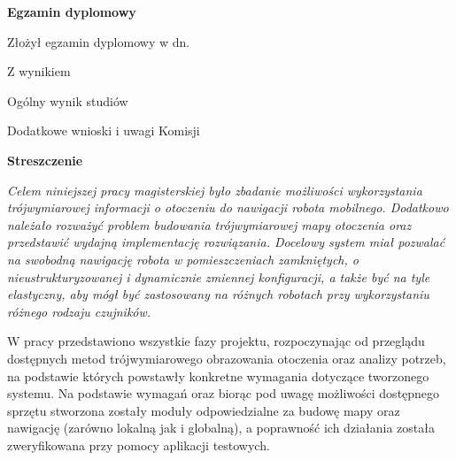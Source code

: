 \begin{titlepage}
    \begin{center}
 	{\large\bfseries Egzamin dyplomowy} \par\bigskip\bigskip
    \end{center}
    \par\noindent\vspace{1.5\baselineskip}
    Złożył egzamin dyplomowy w dn. \dotfill
    \par\noindent\vspace{1.5\baselineskip}
    Z wynikiem \dotfill
    \par\noindent\vspace{1.5\baselineskip}
    Ogólny wynik studiów \dotfill
    \par\noindent\vspace{1.5\baselineskip}
    Dodatkowe wnioski i uwagi Komisji \dotfill
    \par\noindent\vspace{1.5\baselineskip}
    \dotfill


	    \cleardoublepage
    \newpage\thispagestyle{empty}
    \begin{center}
	{\large\bfseries Streszczenie}\par\bigskip
    \end{center}

    {\itshape
    Celem niniejszej pracy magisterskiej było zbadanie możliwości wykorzystania
    trójwymiarowej informacji o otoczeniu do nawigacji robota mobilnego. Dodatkowo
    należało rozważyć problem budowania trójwymiarowej mapy otoczenia oraz przedstawić
    wydajną implementację rozwiązania. Docelowy system miał pozwalać na swobodną
    nawigację robota w pomieszczeniach zamkniętych, o nieustrukturyzowanej i
    dynamicznie zmiennej konfiguracji, a także być na tyle elastyczny, aby mógł być
    zastosowany na różnych robotach przy wykorzystaniu różnego rodzaju czujników.

    W pracy przedstawiono wszystkie fazy projektu, rozpoczynając od przeglądu
    dostępnych metod trójwymiarowego obrazowania otoczenia oraz analizy potrzeb,
    na podstawie których powstawły konkretne wymagania dotyczące tworzonego systemu.
    Na podstawie wymagań oraz biorąc pod uwagę możliwości dostępnego sprzętu
    stworzona zostały moduły odpowiedzialne za budowę mapy oraz nawigację (zarówno
    lokalną jak i globalną), a poprawność ich działania została zweryfikowana przy
    pomocy aplikacji testowych.
    }
    \vspace*{1\baselineskip}


\end{titlepage}
